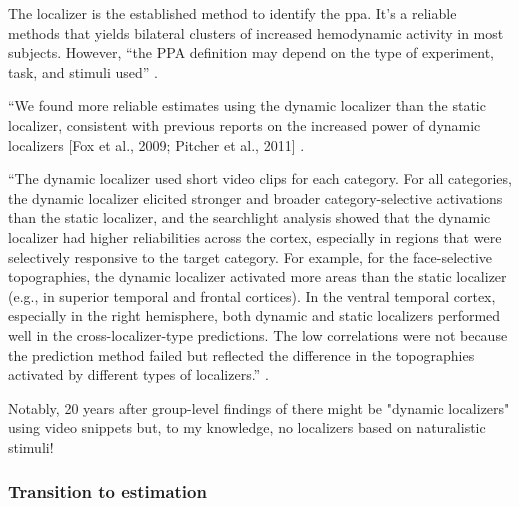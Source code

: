 

%
The localizer is the established method to identify the \ac{ppa}.
It's a reliable methods that yields bilateral clusters of increased hemodynamic
activity in most subjects.
%
However, ``the PPA definition may depend on the type of experiment, task, and
stimuli used'' \citep{weiner2018defining}.


%
``We found more reliable estimates using the dynamic localizer than the static
localizer, consistent with previous reports on the increased power of dynamic
localizers [Fox et al., 2009; Pitcher et al., 2011]
\citep{jiahui2020predicting}.

%
``The dynamic localizer used short video clips for each category.
%
For all categories, the dynamic localizer elicited stronger and broader
category-selective activations than the static localizer, and the searchlight
analysis showed that the dynamic localizer had higher reliabilities across the
cortex, especially in regions that were selectively responsive to the target
category.
%
For example, for the face-selective topographies, the dynamic localizer
activated more areas than the static localizer (e.g., in superior temporal and
frontal cortices).
%
In the ventral temporal cortex, especially in the right hemisphere, both dynamic
and static localizers performed well in the cross-localizer-type predictions.
%
The low correlations were not because the prediction method failed but reflected
the difference in the topographies activated by different types of localizers.''
\citep{jiahui2022cross}.



Notably, 20 years after group-level findings of \citep{bartels2004mapping} there
might be "dynamic localizers" using video snippets
\citep{pitcher2011differential, fox2009defining} but, to my knowledge, no
localizers based on naturalistic stimuli!



\subsubsection{Transition to estimation}

